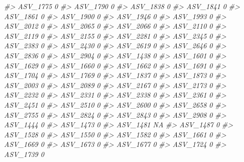 \documentclass[
]{article}
\newenvironment{Shaded}{\begin{snugshade}}{\end{snugshade}}
\newcommand{\CommentTok}[1]{\textcolor[rgb]{0.56,0.35,0.01}{\textit{#1}}}
\begin{document}
\begin{Shaded}
\begin{Highlighting}[]
\CommentTok{\#\textgreater{} ASV\_1775  0}
\CommentTok{\#\textgreater{} ASV\_1790  0}
\CommentTok{\#\textgreater{} ASV\_1838  0}
\CommentTok{\#\textgreater{} ASV\_1841  0}
\CommentTok{\#\textgreater{} ASV\_1861  0}
\CommentTok{\#\textgreater{} ASV\_1900  0}
\CommentTok{\#\textgreater{} ASV\_1946  0}
\CommentTok{\#\textgreater{} ASV\_1993  0}
\CommentTok{\#\textgreater{} ASV\_2012  0}
\CommentTok{\#\textgreater{} ASV\_2065  0}
\CommentTok{\#\textgreater{} ASV\_2066  0}
\CommentTok{\#\textgreater{} ASV\_2110  0}
\CommentTok{\#\textgreater{} ASV\_2119  0}
\CommentTok{\#\textgreater{} ASV\_2155  0}
\CommentTok{\#\textgreater{} ASV\_2281  0}
\CommentTok{\#\textgreater{} ASV\_2345  0}
\CommentTok{\#\textgreater{} ASV\_2383  0}
\CommentTok{\#\textgreater{} ASV\_2430  0}
\CommentTok{\#\textgreater{} ASV\_2619  0}
\CommentTok{\#\textgreater{} ASV\_2646  0}
\CommentTok{\#\textgreater{} ASV\_2836  0}
\CommentTok{\#\textgreater{} ASV\_2904  0}
\CommentTok{\#\textgreater{} ASV\_1438  0}
\CommentTok{\#\textgreater{} ASV\_1601  0}
\CommentTok{\#\textgreater{} ASV\_1629  0}
\CommentTok{\#\textgreater{} ASV\_1660  0}
\CommentTok{\#\textgreater{} ASV\_1662  0}
\CommentTok{\#\textgreater{} ASV\_1691  0}
\CommentTok{\#\textgreater{} ASV\_1704  0}
\CommentTok{\#\textgreater{} ASV\_1769  0}
\CommentTok{\#\textgreater{} ASV\_1837  0}
\CommentTok{\#\textgreater{} ASV\_1873  0}
\CommentTok{\#\textgreater{} ASV\_2003  0}
\CommentTok{\#\textgreater{} ASV\_2089  0}
\CommentTok{\#\textgreater{} ASV\_2167  0}
\CommentTok{\#\textgreater{} ASV\_2173  0}
\CommentTok{\#\textgreater{} ASV\_2232  0}
\CommentTok{\#\textgreater{} ASV\_2331  0}
\CommentTok{\#\textgreater{} ASV\_2338  0}
\CommentTok{\#\textgreater{} ASV\_2361  0}
\CommentTok{\#\textgreater{} ASV\_2451  0}
\CommentTok{\#\textgreater{} ASV\_2510  0}
\CommentTok{\#\textgreater{} ASV\_2600  0}
\CommentTok{\#\textgreater{} ASV\_2658  0}
\CommentTok{\#\textgreater{} ASV\_2755  0}
\CommentTok{\#\textgreater{} ASV\_2824  0}
\CommentTok{\#\textgreater{} ASV\_2843  0}
\CommentTok{\#\textgreater{} ASV\_2908  0}
\CommentTok{\#\textgreater{} ASV\_1444  0}
\CommentTok{\#\textgreater{} ASV\_1473  0}
\CommentTok{\#\textgreater{} ASV\_1481 NA}
\CommentTok{\#\textgreater{} ASV\_1487  0}
\CommentTok{\#\textgreater{} ASV\_1528  0}
\CommentTok{\#\textgreater{} ASV\_1550  0}
\CommentTok{\#\textgreater{} ASV\_1582  0}
\CommentTok{\#\textgreater{} ASV\_1661  0}
\CommentTok{\#\textgreater{} ASV\_1669  0}
\CommentTok{\#\textgreater{} ASV\_1673  0}
\CommentTok{\#\textgreater{} ASV\_1677  0}
\CommentTok{\#\textgreater{} ASV\_1724  0}
\CommentTok{\#\textgreater{} ASV\_1739  0}

\end{Highlighting}
\end{Shaded}
\end{document}
